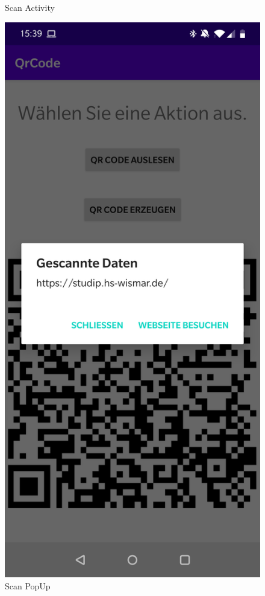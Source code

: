 \documentclass[12pt,					%
							 oneside,			%
							 a4paper,			%
							 halfparskip,		%
							 liststotoc,			%
							 bibtotoc,			%
							 fleqn,				%
							 pointlessnumbers]	%
							 {scrreprt}
\begin{document}
\begin{figure}[ht]
\begin{minipage}[b]{.4\linewidth}
 	\caption{Scan Activity}
   \end{minipage}
   \hspace{.1\linewidth}%
   \begin{minipage}[b]{.4\linewidth} %
	\centering
	\includegraphics[scale=0.1]{pictures/popup} 
	\caption{Scan PopUp}
   \end{minipage}
\end{figure}
\newpage
\end{document}
